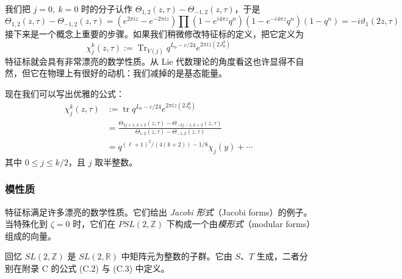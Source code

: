 我们把 $j=0,\ k=0$ 时的分子认作 $\Theta_{1,2}(z,\tau)-\Theta_{-1,2}(z,\tau)$，于是
\begin{equation}
  \Theta_{1,2}(z,\tau)-\Theta_{-1,2}(z,\tau)
  =(e^{2\pi iz}-e^{-2\pi iz})\prod(1-e^{i4\pi z}q^{n})(1-e^{-i4\pi z}q^{n})(1-q^{n})
  =-i\vartheta_1(2z,\tau)
  \tag{4.167}
  \label{eq:4.167}
\end{equation}
接下来是一个概念上重要的步骤。如果我们稍微修改特征标的定义，把它定义为
\begin{equation}
  \chi_j^k(z,\tau):=\operatorname{Tr}_{V(j)}q^{L_0-c/24}e^{2\pi iz(2J_0^3)}
  \tag{4.168}
  \label{eq:4.168}
\end{equation}
特征标就会具有非常漂亮的数学性质。从 Lie 代数理论的角度看这也许显得不自然，但它在物理上有很好的动机：我们减掉的是基态能量。

现在我们可以写出优雅的公式：
\begin{equation}
\begin{aligned}
  \chi_j^k(z,\tau) &:= \operatorname{tr}q^{L_0-c/24}e^{2\pi iz(2J_0^3)}\\
  &= \frac{\Theta_{2j+1,k+2}(z,\tau)-\Theta_{-2j-1,k+2}(z,\tau)}{\Theta_{1,2}(z,\tau)-\Theta_{-1,2}(z,\tau)}\\
  &= q^{(\ell+1)^2/(4(k+2))-1/8}\chi_j(y)+\cdots
\end{aligned}
  \tag{4.169}
  \label{eq:4.169}
\end{equation}
其中 $0\le j\le k/2$，且 $j$ 取半整数。

\subsubsection{模性质} %

特征标满足许多漂亮的数学性质。它们给出 \emph{Jacobi 形式}（Jacobi forms）的例子。当特殊化到 $\zeta=0$ 时，它们在 $PSL(2,\mathbb{Z})$ 下构成一个由\emph{模形式}（modular forms）组成的向量。

回忆 $SL(2,\mathbb{Z})$ 是 $SL(2,\mathbb{R})$ 中矩阵元为整数的子群。它由 $S$、$T$ 生成，二者分别在附录 C 的公式 (C.2) 与 (C.3) 中定义。

